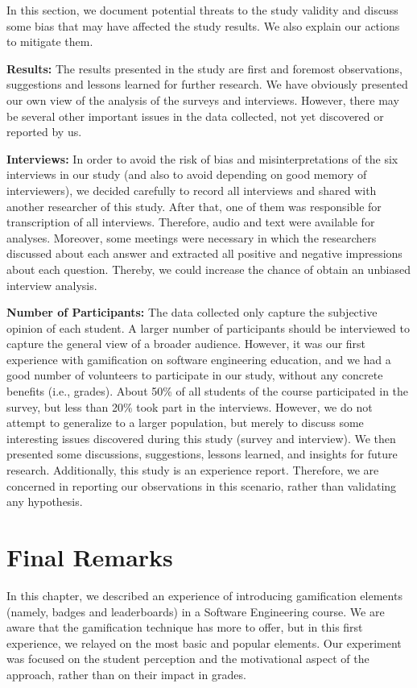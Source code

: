In this section, we document potential threats to the study validity and discuss some bias that may have affected the study results. We also explain our actions to mitigate them.

\textbf{Results:} The results presented in the study are first and foremost observations, suggestions and lessons learned for further research. We have obviously presented our own view of the analysis of the surveys and interviews. However, there may be several other important issues in the data collected, not yet discovered or reported by us. 

\textbf{Interviews:} In order to avoid the risk of bias and misinterpretations of the six interviews in our study (and also to avoid depending on good memory of interviewers), we decided carefully to record all interviews and shared with another researcher of this study. After that, one of them was responsible for transcription of all interviews. Therefore, audio and text were available for analyses. Moreover, some meetings were necessary in which the researchers discussed about each answer and extracted all positive and negative impressions about each question. Thereby, we could increase the chance of obtain an unbiased interview analysis.

\textbf{Number of Participants:} The data collected only capture the subjective opinion of each student. A larger number of participants should be interviewed to capture the general view of a broader audience. However, it was our first experience with gamification on software engineering education, and we had a good number of volunteers to participate in our study, without any concrete benefits (i.e., grades). About 50\% of all students of the course participated in the survey, but less than 20\% took part in the interviews. However, we do not attempt to generalize to a larger population, but merely to discuss some interesting issues discovered during this study (survey and interview). We then presented some discussions, suggestions, lessons learned, and insights for future research. Additionally, this study is an experience report. Therefore, we are concerned in reporting our observations in this scenario, rather than validating any hypothesis.

\section{Final Remarks}

In this chapter, we described an experience of introducing gamification elements (namely, badges and leaderboards) in a Software Engineering course. We are aware that the gamification technique has more to offer, but in this first experience, we relayed on the most basic and popular elements. Our experiment was focused on the student perception and the motivational aspect of the approach, rather than on their impact in grades.

